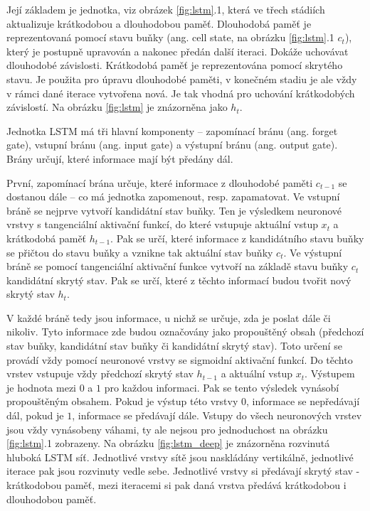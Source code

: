 Její základem je jednotka, viz obrázek \ref{fig:lstm}.1, která ve třech
stádiích aktualizuje krátkodobou a dlouhodobou paměť. Dlouhodobá paměť je
reprezentovaná pomocí stavu buňky (ang. cell state, na obrázku \ref{fig:lstm}.1
$c_t$), který je postupně upravován a nakonec předán další iteraci. Dokáže
uchovávat dlouhodobé závislosti. Krátkodobá paměť je reprezentována pomocí
skrytého stavu. Je použita pro úpravu dlouhodobé paměti, v konečném stadiu je
ale vždy v rámci dané iterace vytvořena nová. Je tak vhodná pro uchování
krátkodobých závislostí. Na obrázku \ref{fig:lstm} je znázorněna jako $h_t$.

Jednotka LSTM má tři hlavní komponenty – zapomínací bránu (ang. forget gate),
vstupní bránu (ang. input gate) a výstupní bránu (ang. output gate). Brány
určují, které informace mají být předány dál.

První, zapomínací brána určuje, které informace z dlouhodobé paměti $c_{t-1}$
se dostanou dále – co má jednotka zapomenout, resp. zapamatovat. Ve vstupní
bráně se nejprve vytvoří kandidátní stav buňky. Ten je výsledkem neuronové
vrstvy s tangenciální aktivační funkcí, do které vstupuje aktuální vstup $x_t$
a krátkodobá paměť $h_{t-1}$. Pak se určí, které informace z kandidátního stavu
buňky se přičtou do stavu buňky a vznikne tak aktuální stav buňky $c_t$. Ve
výstupní bráně se pomocí tangenciální aktivační funkce vytvoří na základě stavu
buňky $c_t$ kandidátní skrytý stav. Pak se určí, které z těchto informací budou
tvořit nový skrytý stav $h_t$.

V každé bráně tedy jsou informace, u nichž se určuje, zda je poslat dále či
nikoliv. Tyto informace zde budou označovány jako propouštěný obsah (předchozí stav buňky,
kandidátní stav buňky či kandidátní skrytý stav). Toto určení se provádí vždy
pomocí neuronové vrstvy se sigmoidní aktivační funkcí. Do těchto vrstev
vstupuje vždy předchozí skrytý stav $h_{t-1}$ a aktuální vstup $x_t$. Výstupem
je hodnota mezi $0$ a $1$ pro každou informaci. Pak se tento výsledek vynásobí
propouštěným obsahem. Pokud je výstup této vrstvy $0$, informace se nepředávají
dál, pokud je $1$, informace se předávají dále. Vstupy do všech neuronových
vrstev jsou vždy vynásobeny váhami, ty ale nejsou pro jednoduchost na obrázku
\ref{fig:lstm}.1 zobrazeny. Na obrázku \ref{fig:lstm_deep} je znázorněna
rozvinutá hluboká LSTM síť. Jednotlivé vrstvy sítě jsou naskládány vertikálně,
jednotlivé iterace pak jsou rozvinuty vedle sebe. Jednotlivé vrstvy si
předávají skrytý stav - krátkodobou paměť, mezi iteracemi si pak daná vrstva
předává krátkodobou i dlouhodobou paměť.

